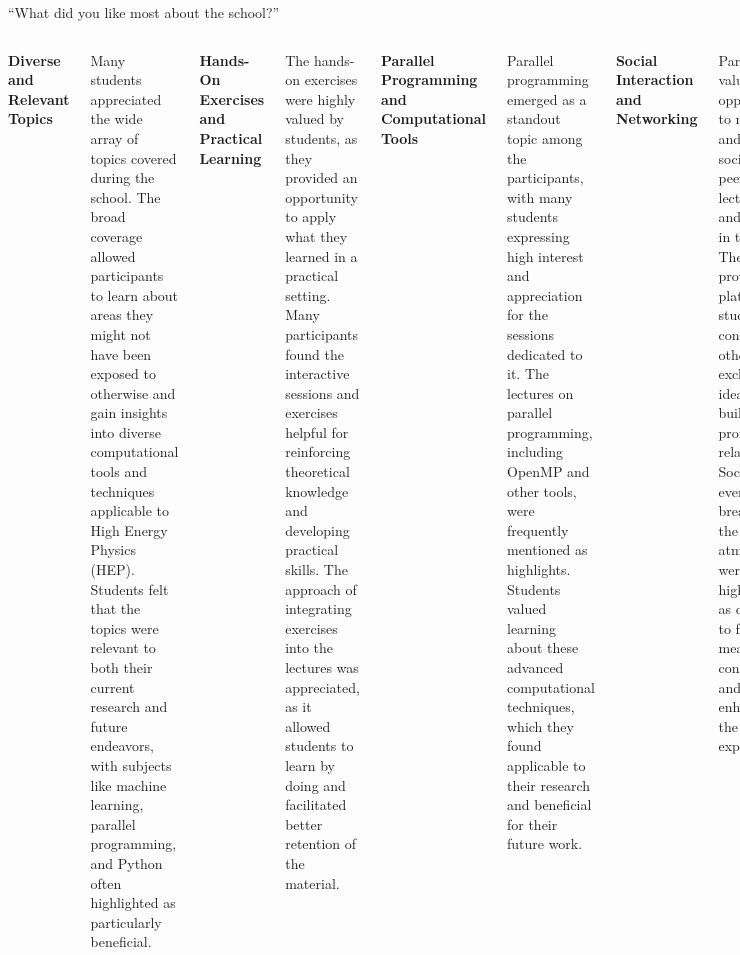 \documentclass[aspectratio=169]{beamer}
\begin{document}
\begin{frame}{``What did you like most about the school?''}
\tiny
\vspace{0.25 cm}
\begin{columns}
{\bf\small Diverse and Relevant Topics}

Many students appreciated the wide array of topics covered during the school. The broad coverage allowed participants to learn about areas they might not have been exposed to otherwise and gain insights into diverse computational tools and techniques applicable to High Energy Physics (HEP). Students felt that the topics were relevant to both their current research and future endeavors, with subjects like machine learning, parallel programming, and Python often highlighted as particularly beneficial.

\vspace{0.2 cm}
{\bf\small Hands-On Exercises and Practical Learning}

The hands-on exercises were highly valued by students, as they provided an opportunity to apply what they learned in a practical setting. Many participants found the interactive sessions and exercises helpful for reinforcing theoretical knowledge and developing practical skills. The approach of integrating exercises into the lectures was appreciated, as it allowed students to learn by doing and facilitated better retention of the material.

\vspace{0.2 cm}
{\bf\small Parallel Programming and Computational Tools}

Parallel programming emerged as a standout topic among the participants, with many students expressing high interest and appreciation for the sessions dedicated to it. The lectures on parallel programming, including OpenMP and other tools, were frequently mentioned as highlights. Students valued learning about these advanced computational techniques, which they found applicable to their research and beneficial for their future work.

\vspace{0.2 cm}
{\bf\small Social Interaction and Networking}

Participants valued the opportunity to network and interact socially with peers, lecturers, and experts in the field. The school provided a platform for students to connect with others, exchange ideas, and build professional relationships. Social events, coffee breaks, and the overall atmosphere were highlighted as conducive to forming meaningful connections and enhancing the learning experience.


\end{columns}
\end{frame}
\end{document}
